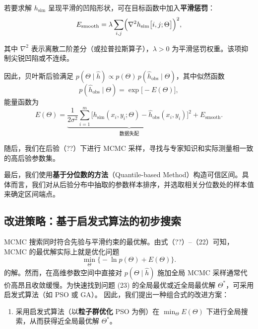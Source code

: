 \documentclass[11pt,a4paper,fontset=windows]{ctexart}
\begin{document}
若要求解 $h_{\text{sim}}$ 呈现平滑的凹陷形状，可在目标函数中加入\textbf{平滑惩罚}：
\begin{equation}
E_{\text{smooth}}=\lambda\sum_{i,j}\Bigl(\nabla^2h_{\text{sim}}\bigl[i,j;\Theta\bigr]\Bigr)^2,
\end{equation}

其中 $\nabla^2$ 表示离散二阶差分（或拉普拉斯算子），$\lambda>0$ 为平滑惩罚权重。该项抑制尖锐凹陷或不连续。

因此，贝叶斯后验满足 $p(\Theta\mid\hat{h})\propto p(\Theta)\,p(\hat{h}_{\text{obs}}\mid\Theta)$，其中似然函数
\begin{equation}
p(\hat{h}_{\text{obs}}\mid\Theta)=\exp\bigl[-E(\Theta)\bigr],
\end{equation}
能量函数为
\begin{equation}
E(\Theta)=\underbrace{\frac{1}{2\sigma^2}\sum_{i=1}^{m}\bigl[h_{\text{sim}}(x_i,y_i;\Theta)-\hat{h}_{\text{obs}}(x_i,y_i)\bigr]^2}_{\text{数据失配}}
+E_{\text{smooth}}.
\end{equation}

随后，我们在后验（??）下进行 MCMC 采样，寻找与专家知识和实际测量相一致的高后验参数集。

最后，我们使用\textbf{基于分位数的方法}（Quantile-based Method）构造可信区间。具体而言，我们对从后验分布中抽取的参数样本排序，并选取相关分位数处的样本值来确定区间端点。

\subsection{改进策略：基于启发式算法的初步搜索}

MCMC 搜索同时符合先验与平滑约束的最优解。由式（??）--（22）可知，MCMC 的最优解实际上就是优化问题
\begin{equation}
\min_{\Theta}\bigl\{-\ln p(\Theta)+E(\Theta)\bigr\}.
\end{equation}
的解。然而，在高维参数空间中直接对 $p(\Theta\mid\hat{h})$ 施加全局 MCMC 采样通常代价高昂且收敛缓慢。为快速找到问题 (23) 的全局最优或近全局最优解 $\Theta^{*}$，可采用启发式算法（如 PSO 或 GA）。\cite{8} 因此，我们提出一种组合式的改进方案：

\begin{enumerate}
\item 采用启发式算法（以\textbf{粒子群优化} PSO 为例）在 $\min_{\Theta}E(\Theta)$ 下进行全局搜索，从而获得近全局最优解 $\Theta^{*}$。
\end{enumerate}
\end{document}

